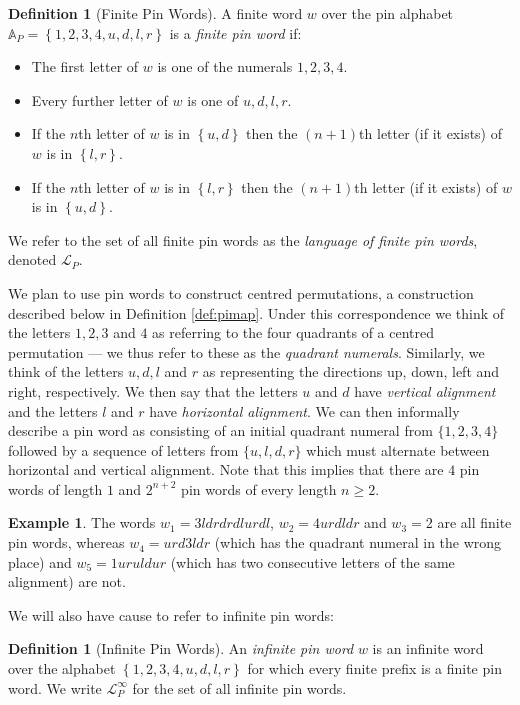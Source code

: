 \documentclass[11pt,a4paper]{article}
\theoremstyle{definition}
\newtheorem{defn}[thm]{Definition}
\newtheorem{example}[thm]{Example}
\begin{document}
\begin{defn}[Finite Pin Words] \label{def:finpinword}
A finite word $w$ over the pin alphabet $\mathbb{A}_{P} = \left\{1,2,3,4,u,d,l,r\right\}$ is a \emph{finite pin word} if:
\begin{itemize}
\item The first letter of $w$ is one of the numerals $1,2,3,4$.
\item Every further letter of $w$ is one of $u,d,l,r$.
\item If the $n$th letter of $w$ is in $\left\{u,d\right\}$ then the $(n+1)$th letter (if it exists) of $w$ is in $\left\{l,r\right\}$.
\item If the $n$th letter of $w$ is in $\left\{l,r\right\}$ then the $(n+1)$th letter (if it exists) of $w$ is in $\left\{u,d\right\}$.
\end{itemize}
We refer to the set of all finite pin words as the \emph{language of finite pin words}, denoted $\mathcal{L}_{P}$.
\end{defn}

We plan to use pin words to construct centred permutations, a construction described below in Definition \ref{def:pimap}. Under this correspondence we think of the letters $1,2,3$ and $4$ as referring to the four quadrants of a centred permutation --- we thus refer to these as the \emph{quadrant numerals}. Similarly, we think of the letters $u,d,l$ and $r$ as representing the directions up, down, left and right, respectively. We then say that the letters $u$ and $d$ have \emph{vertical alignment} and the letters $l$ and $r$ have \emph{horizontal alignment}. We can then informally describe a pin word as consisting of an initial quadrant numeral from $\{1,2,3,4\}$ followed by a sequence of letters from $\{u,l,d,r\}$ which must alternate between horizontal and vertical alignment. Note that this implies that there are $4$ pin words of length $1$ and $2^{n+2}$ pin words of every length $n \geq 2$.

\begin{example}
The words $w_{1} = 3ldrdrdlurdl$, $w_{2} = 4urdldr$ and $w_{3} = 2$ are all finite pin words, whereas $w_{4} = urd3ldr$ (which has the quadrant numeral in the wrong place) and $w_{5} = 1uruldur$ (which has two consecutive letters of the same alignment) are not.
\end{example}

We will also have cause to refer to infinite pin words:

\begin{defn}[Infinite Pin Words]
An \emph{infinite pin word} $w$ is an infinite word over the alphabet $\left\{1,2,3,4,u,d,l,r\right\}$ for which every finite prefix is a finite pin word.
We write $\mathcal{L}^{\infty}_{P}$ for the set of all infinite pin words.
\end{defn}
\end{document}
